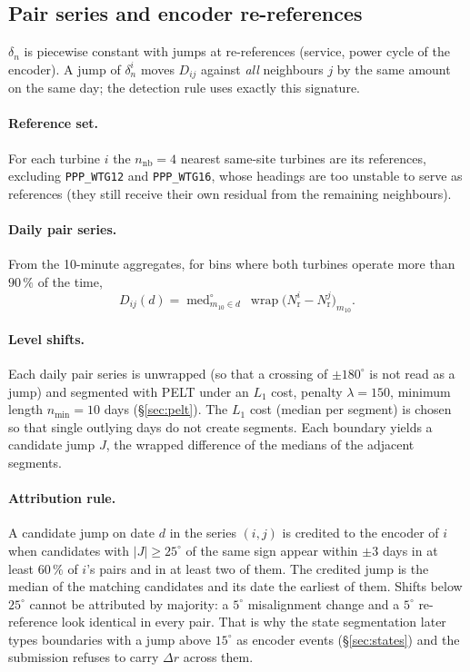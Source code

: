 \documentclass[11pt,a4paper]{article}
\theoremstyle{remark}
\newcommand{\wrap}{\operatorname{wrap}}
\newcommand{\cmed}{\operatorname{med}^{\circ}}
\newcommand{\dg}{^{\circ}}
\newcommand{\code}[1]{\texttt{#1}}
\newcommand{\Nr}{N_{\mathrm{r}}}
\begin{document}
\subsection{Pair series and encoder re-references}\label{sec:destep}
$\delta_n$ is piecewise constant with jumps at re-references (service, power
cycle of the encoder). A jump of $\delta_n^i$ moves $D_{ij}$ against \emph{all}
neighbours $j$ by the same amount on the same day; the detection rule uses
exactly this signature.

\paragraph{Reference set.} For each turbine $i$ the $n_{\mathrm{nb}}=4$ nearest
same-site turbines are its references, excluding \code{PPP\_WTG12} and
\code{PPP\_WTG16}, whose headings are too unstable to serve as references (they
still receive their own residual from the remaining neighbours).

\paragraph{Daily pair series.} From the 10-minute aggregates, for bins where both
turbines operate more than $90\,\%$ of the time,
\begin{equation}
  D_{ij}(d) = \cmed_{m_{10}\in d}\ \wrap\big(\Nr^i - \Nr^j\big)_{m_{10}} .
  \label{eq:pair_daily}
\end{equation}

\paragraph{Level shifts.} Each daily pair series is unwrapped (so that a
crossing of $\pm180\dg$ is not read as a jump) and segmented with PELT under an
$L_1$ cost, penalty $\lambda=150$, minimum length $n_{\min}=10$ days
(\S\ref{sec:pelt}). The $L_1$ cost (median per segment) is chosen so that single
outlying days do not create segments. Each boundary yields a candidate jump
$J$, the wrapped difference of the medians of the adjacent segments.

\paragraph{Attribution rule.} A candidate jump on date $d$ in the series
$(i,j)$ is credited to the encoder of $i$ when candidates with $|J|\ge25\dg$ of
the same sign appear within $\pm3$ days in at least $60\,\%$ of $i$'s pairs and
in at least two of them. The credited jump is the median of the matching
candidates and its date the earliest of them. Shifts below $25\dg$ cannot be
attributed by majority: a $5\dg$ misalignment change and a $5\dg$
re-reference look identical in every pair. That is why the state segmentation
later types boundaries with a jump above $15\dg$ as encoder events
(\S\ref{sec:states}) and the submission refuses to carry $\Delta r$ across
them.
\end{document}
